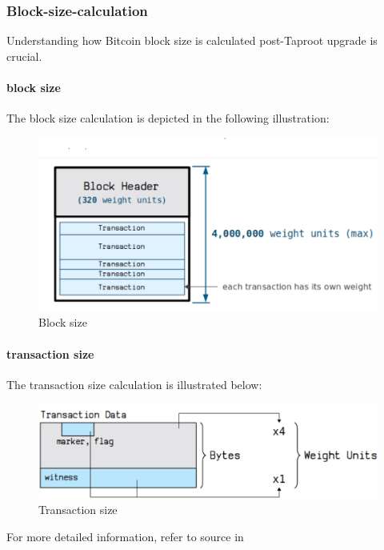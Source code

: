 \subsubsection{Block-size-calculation}

Understanding how Bitcoin block size is calculated post-Taproot upgrade is crucial.

\paragraph*{block size}

The block size calculation is depicted in the following illustration:

\begin{figure}[ht] 
    \centering  
    \includegraphics[width=0.85\columnwidth]{images/block-size.png} 
    \caption{Block size}
    \label{fig:block-size}
\end{figure}

\paragraph*{transaction size}

The transaction size calculation is illustrated below:

\begin{figure}[ht] 
    \centering  
    \includegraphics[width=0.85\columnwidth]{images/transaction-size.png} 
    \caption{Transaction size}
    \label{fig:transaction-size}
\end{figure}

For more detailed information, refer to source in \cite{website:transaction-size}

